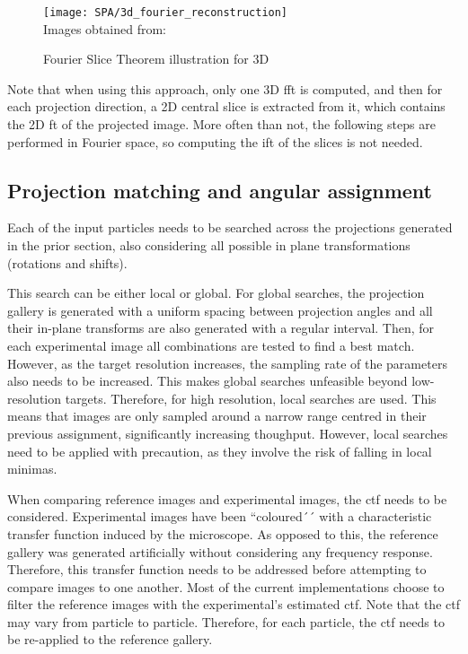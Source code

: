 \documentclass[../main.tex]{subfiles}
\begin{document}
\begin{figure}[h]
    \centering
    \texttt{[image: SPA/3d\_fourier\_reconstruction]}\\
    Images obtained from: \cite{nogales2015}
    \caption{Fourier Slice Theorem illustration for 3D}
    \label{fig:3:3dfourier}
\end{figure}

Note that when using this approach, only one 3D \gls{fft} is computed, and then for each projection direction, a 2D central slice is extracted from it, which contains the 2D \gls{ft} of the projected image. More often than not, the following steps are performed in Fourier space, so computing the \gls{ift} of the slices is not needed.

\subsection{Projection matching and angular assignment}
Each of the input particles needs to be searched across the projections generated in the prior section, also considering all possible in plane transformations (rotations and shifts). 

This search can be either local or global. For global searches, the projection gallery is generated with a uniform spacing between projection angles and all their in-plane transforms are also generated with a regular interval. Then, for each experimental image all combinations are tested to find a best match. However, as the target resolution increases, the sampling rate of the parameters also needs to be increased. This makes global searches unfeasible beyond low-resolution targets. Therefore, for high resolution, local searches are used. This means that images are only sampled around a narrow range centred in their previous assignment, significantly increasing thoughput. However, local searches need to be applied with precaution, as they involve the risk of falling in local minimas.

When comparing reference images and experimental images, the \gls{ctf} needs to be considered. Experimental images have been ``coloured´´ with a characteristic transfer function induced by the microscope. As opposed to this, the reference gallery was generated artificially without considering any frequency response. Therefore, this transfer function needs to be addressed before attempting to compare images to one another. Most of the current implementations choose to filter the reference images with the experimental's estimated \gls{ctf}. Note that the \gls{ctf} may vary from particle to particle. Therefore, for each particle, the \gls{ctf} needs to be re-applied to the reference gallery.
\end{document}
